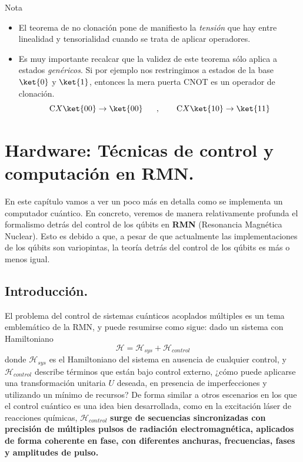 \documentclass[a4paper,11pt]{book} %
\numberwithin{equation}{chapter}
\newcommand{\cg}[1]{{\rm C}#1}
\begin{document}
	\begin{mybox_blue}{Nota}
	\begin{itemize}
		\item El teorema de no clonación pone  de manifiesto la  \textit{tensión} que hay entre linealidad y tensorialidad cuando se trata de aplicar operadores.
		\item Es muy importante recalcar que la validez de este teorema sólo aplica a estados \textit{genéricos}. 
	Si por ejemplo nos restringimos a estados de la base $\ket{0}$ y $\ket{1}$, entonces la mera puerta CNOT es un operador de clonación.
    \begin{equation}
	\cg{X}\ket{00}\to \ket{00}~~~~~,~~~~~~ \cg{X}\ket{10}\to \ket{11}
	\end{equation}
	\end{itemize}		 
	\end{mybox_blue}









\chapter{Hardware: Técnicas de control y computación en RMN.}

En este capítulo vamos a ver un poco más en detalla como se implementa un computador cuántico. En concreto, veremos de manera relativamente profunda el formalismo detrás del control de los qúbits en \textbf{RMN} (Resonancia Magnética Nuclear). Esto es debido a que, a pesar de que actualmente las implementaciones de los qúbits son variopintas, la teoría detrás del control de los qúbits es más o menos igual. 

	\section{Introducción.}

El problema del control de sistemas cuánticos acoplados múltiples es un tema emblemático de la RMN, y puede resumirse como sigue: dado un sistema con Hamiltoniano
\begin{equation}
\mathcal{H} = \mathcal{H}_{sys} + \mathcal{H}_{control}
\end{equation}
donde $\mathcal{H}_{sys}$ es el Hamiltoniano del sistema en ausencia de cualquier control, y $\mathcal{H}_{control}$ describe términos que están bajo control externo, ¿cómo puede aplicarse una transformación unitaria $U$ deseada, en presencia de imperfecciones y utilizando un mínimo de recursos? De forma similar a otros escenarios en los que el control cuántico es una idea bien desarrollada, como en la excitación láser de reacciones químicas, $\mathcal{H}_{control}$ \textbf{surge de secuencias sincronizadas con precisión de múltiples pulsos de radiación electromagnética, aplicados de forma coherente en fase, con diferentes anchuras, frecuencias, fases y amplitudes de pulso.}
\end{document}
